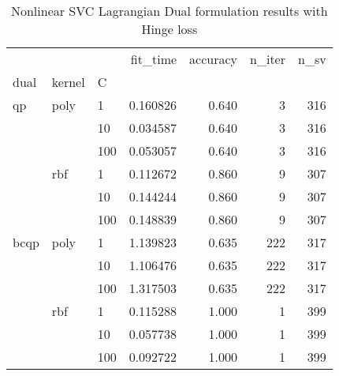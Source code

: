 \begin{table}[H]
\centering
\caption{Nonlinear SVC Lagrangian Dual formulation results with Hinge loss}
\label{nonlinear_lagrangian_dual_svc_cv_results}
\begin{tabular}{lllrrrr}
\toprule
     &     &     &  fit\_time &  accuracy &  n\_iter &  n\_sv \\
dual & kernel & C &           &           &         &       \\
\midrule
qp & poly & 1   &  0.160826 &     0.640 &       3 &   316 \\
     &     & 10  &  0.034587 &     0.640 &       3 &   316 \\
     &     & 100 &  0.053057 &     0.640 &       3 &   316 \\
     & rbf & 1   &  0.112672 &     0.860 &       9 &   307 \\
     &     & 10  &  0.144244 &     0.860 &       9 &   307 \\
     &     & 100 &  0.148839 &     0.860 &       9 &   307 \\
bcqp & poly & 1   &  1.139823 &     0.635 &     222 &   317 \\
     &     & 10  &  1.106476 &     0.635 &     222 &   317 \\
     &     & 100 &  1.317503 &     0.635 &     222 &   317 \\
     & rbf & 1   &  0.115288 &     1.000 &       1 &   399 \\
     &     & 10  &  0.057738 &     1.000 &       1 &   399 \\
     &     & 100 &  0.092722 &     1.000 &       1 &   399 \\
\bottomrule
\end{tabular}
\end{table}
